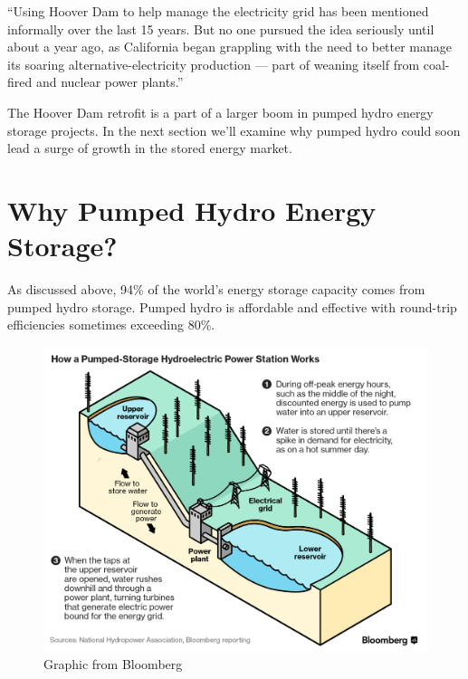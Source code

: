 \documentclass[hidelinks,12pt,a4paper]{article}
\begin{document}
\begin{displayquote}
“Using Hoover Dam to help manage the electricity grid has been mentioned informally over the last 15 years. But no one pursued the idea seriously until about a year ago, as California began grappling with the need to better manage its soaring alternative-electricity production — part of weaning itself from coal-fired and nuclear power plants.” \cite{The3BillionPlanToTurnHooverDamIntoAGiantBattery}
\end{displayquote}

The Hoover Dam retrofit is a part of a larger boom in pumped hydro energy storage projects. In the next section we'll examine why pumped hydro could soon lead a surge of growth in the stored energy market.

\pagebreak[4]
\section{Why Pumped Hydro Energy Storage?}
As discussed above, 94\% of the world's energy storage capacity comes from pumped hydro storage. \cite{ElectricStorageCapacityInTheUnitedStates} Pumped hydro is affordable and effective with round-trip efficiencies sometimes exceeding 80\%. \cite{ESAPumpedHydroelectricStorage}

\begin{figure}[ht!]
    \centering
    \includegraphics[width=1\textwidth]{bloomberg-how-pumped-storage-works.png}
    \caption{Graphic from Bloomberg \cite{QuestforBiggerBatteries}}
\end{figure}
\FloatBarrier
\end{document}
